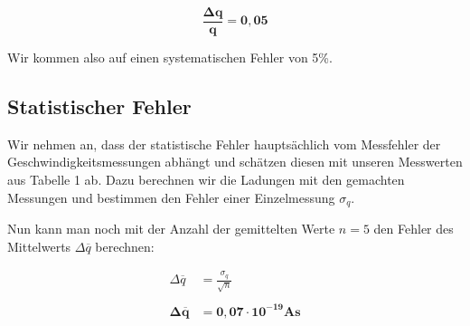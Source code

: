 \documentclass{article}
\begin{document}
\begin{equation}
    \bm{\frac{\Delta q}{q}} = \bm{0,05}
\end{equation}

Wir kommen also auf einen systematischen Fehler von 5\%.

\newpage

\subsection{Statistischer Fehler}

Wir nehmen an, dass der statistische Fehler hauptsächlich vom Messfehler der Geschwindigkeitsmessungen abhängt und schätzen diesen mit unseren Messwerten aus Tabelle 1 ab. Dazu berechnen wir die Ladungen mit den gemachten Messungen und bestimmen den Fehler einer Einzelmessung $\sigma_q$.


\begin{table} [!h]
    \centering
    \caption{Bestimmung der Ladung \& Fehler der Einzelmessung}
    \label{tab:fehler}
\end{table}

Nun kann man noch mit der Anzahl der gemittelten Werte $n=5$ den Fehler des Mittelwerts $\Delta \overline{q}$ berechnen:

\begin{equation}
    \begin{split}
        \Delta \overline{q} &= \frac{\sigma_q}{\sqrt{n}} \\ \\
        \bm{\Delta \overline{q}} &= \bm{0,07 \cdot 10^{-19}} \textbf{As}
    \end{split}
\end{equation}
\end{document}
